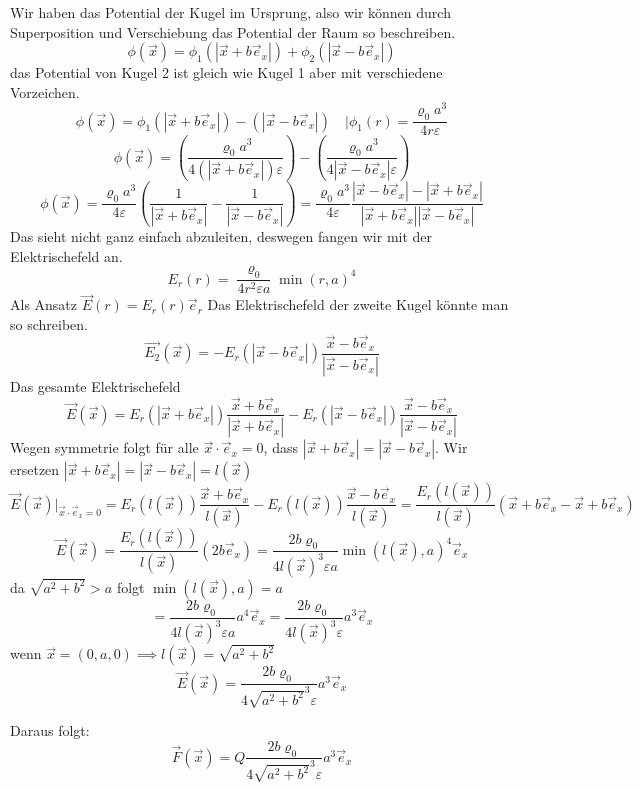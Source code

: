 \documentclass{scrartcl}
\let\*\cdot
\begin{document}
\begin{itemize}
Wir haben das Potential der Kugel im Ursprung, also wir können durch Superposition und Verschiebung das Potential der Raum so beschreiben.
\[\phi(\vec{x})=\phi_1(|\vec{x}+b \vec{e}_x|)+\phi_2(|\vec{x}-b \vec{e}_x|)\]
das Potential von Kugel 2 ist gleich wie Kugel 1 aber mit verschiedene Vorzeichen.
\[\phi(\vec{x})=\phi_1(|\vec{x}+b \vec{e}_x|)-(|\vec{x}-b \vec{e}_x|)\quad | \phi_1(r)=\frac{\varrho_0 a^3}{4 r \varepsilon}\]
\[\phi(\vec{x})=\left(\frac{\varrho_0 a^3}{4 (|\vec{x}+b \vec{e}_x|)\varepsilon}\right)-\left(\frac{\varrho_0 a^3}{4|\vec{x}-b \vec{e}_x| \varepsilon}\right)\]
\[\phi(\vec{x})=\frac{\varrho_0 a^3}{4\varepsilon}\left(\frac{1}{ |\vec{x}+b \vec{e}_x|}-\frac{1}{|\vec{x}-b \vec{e}_x|}\right)
=\frac{\varrho_0 a^3}{4\varepsilon}\frac{|\vec{x}-b \vec{e}_x|- |\vec{x}+b \vec{e}_x|}{ |\vec{x}+b \vec{e}_x| |\vec{x}-b \vec{e}_x|}\]
Das sieht nicht ganz einfach abzuleiten, deswegen fangen wir mit der Elektrischefeld an.
\[ E_r(r)  =\frac{\varrho_0}{4 r^2 \varepsilon a} {\min(r,a)}^4 \]
Als Ansatz $\vec{E}(r)=E_r(r)\vec{e}_r$
Das Elektrischefeld der zweite Kugel könnte man so schreiben.
\[ \vec{E_2}(\vec{x})  =-E_r(|\vec{x}-b\vec{e}_x|)\frac{\vec{x}-b\vec{e}_x}{|\vec{x}-b\vec{e}_x|}\]
Das gesamte Elektrischefeld
\[ \vec{E}(\vec{x})  =E_r(|\vec{x}+b\vec{e}_x|)\frac{\vec{x}+b\vec{e}_x}{|\vec{x}+b\vec{e}_x|}-E_r(|\vec{x}-b\vec{e}_x|)\frac{\vec{x}-b\vec{e}_x}{|\vec{x}-b\vec{e}_x|}\]
Wegen symmetrie folgt für alle $\vec{x}\*\vec{e}_x= 0$, dass $|\vec{x}+b \vec{e}_x|=|\vec{x}-b \vec{e}_x|$.
Wir ersetzen  $|\vec{x}+b \vec{e}_x|=|\vec{x}-b \vec{e}_x|=l(\vec{x})$
\[ \vec{E}(\vec{x})|_{\vec{x}\*\vec{e}_x= 0}  =E_r(l(\vec{x}))\frac{\vec{x}+b\vec{e}_x}{l(\vec{x})}-E_r(l(\vec{x}))\frac{\vec{x}-b\vec{e}_x}{l(\vec{x})}
=\frac{E_r(l(\vec{x}))}{l(\vec{x})}
\left(\vec{x}+b\vec{e}_x-\vec{x}+b\vec{e}_x\right)\]
\[ \vec{E}(\vec{x}) =\frac{E_r(l(\vec{x}))}{l(\vec{x})}
\left(2b\vec{e}_x\right)
=\frac{2b \varrho_0}{4 {l(\vec{x})}^3 \varepsilon a} {\min(l(\vec{x}),a)}^4\vec{e}_x\]
da $\sqrt{a^2+b^2}>a$ folgt $\min(l(\vec{x}),a)=a$
\[=\frac{2b \varrho_0}{4 {l(\vec{x})}^3 \varepsilon a} a^4\vec{e}_x
=\frac{2b \varrho_0}{4 {l(\vec{x})}^3 \varepsilon } a^3 \vec{e}_x\]
wenn $\vec{x}=(0,a,0)\implies l(\vec{x})=\sqrt{a^2+b^2}$
\[ \vec{E}(\vec{x}) 
=\frac{2b \varrho_0}{4 {\sqrt{a^2+b^2}}^3 \varepsilon } a^3 \vec{e}_x\]

Daraus folgt:
\[ \vec{F}(\vec{x}) 
=Q \frac{2b \varrho_0}{4 {\sqrt{a^2+b^2}}^3 \varepsilon } a^3 \vec{e}_x\]
\end{itemize}
\end{document}
